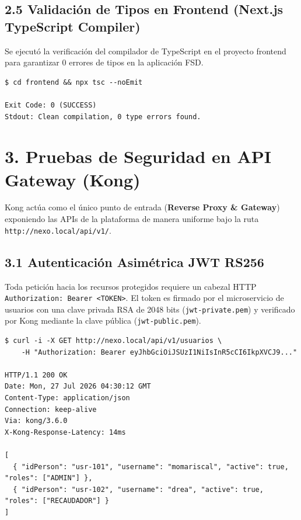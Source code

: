 \documentclass[11pt,a4paper]{article}
\begin{document}
\subsection{2.5 Validación de Tipos en Frontend (Next.js TypeScript Compiler)}
Se ejecutó la verificación del compilador de TypeScript en el proyecto frontend para garantizar 0 errores de tipos en la aplicación FSD.

\begin{macdraculacode}
\begin{lstlisting}
$ cd frontend && npx tsc --noEmit

Exit Code: 0 (SUCCESS)
Stdout: Clean compilation, 0 type errors found.
\end{lstlisting}
\end{macdraculacode}

\section{3. Pruebas de Seguridad en API Gateway (Kong)}

Kong actúa como el único punto de entrada (\textbf{Reverse Proxy \& Gateway}) exponiendo las APIs de la plataforma de manera uniforme bajo la ruta \texttt{http://nexo.local/api/v1/}.

\subsection{3.1 Autenticación Asimétrica JWT RS256}
Toda petición hacia los recursos protegidos requiere un cabezal HTTP \texttt{Authorization: Bearer <TOKEN>}. El token es firmado por el microservicio de usuarios con una clave privada RSA de 2048 bits (\texttt{jwt-private.pem}) y verificado por Kong mediante la clave pública (\texttt{jwt-public.pem}).

\begin{macdraculacode}
\begin{lstlisting}
$ curl -i -X GET http://nexo.local/api/v1/usuarios \
    -H "Authorization: Bearer eyJhbGciOiJSUzI1NiIsInR5cCI6IkpXVCJ9..."

HTTP/1.1 200 OK
Date: Mon, 27 Jul 2026 04:30:12 GMT
Content-Type: application/json
Connection: keep-alive
Via: kong/3.6.0
X-Kong-Response-Latency: 14ms

[
  { "idPerson": "usr-101", "username": "momariscal", "active": true, "roles": ["ADMIN"] },
  { "idPerson": "usr-102", "username": "drea", "active": true, "roles": ["RECAUDADOR"] }
]
\end{lstlisting}
\end{macdraculacode}
\end{document}
